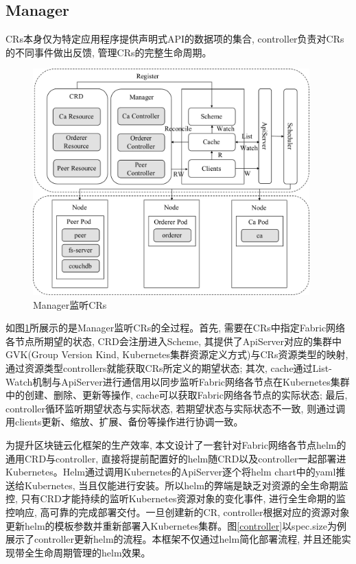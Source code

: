 \subsection{Manager}

CRs本身仅为特定应用程序提供声明式API的数据项的集合, controller负责对CRs的不同事件做出反馈, 管理CRs的完整生命周期。

\begin{figure}[h] %
    \centering %
    \includegraphics[width=0.95\textwidth]{FIGs/chapter4/manager.pdf} %
    \caption{Manager监听CRs} %
    \label{manager} %
\end{figure}%

如图\ref{manager}所展示的是Manager监听CRs的全过程。首先, 需要在CRs中指定Fabric网络各节点所期望的状态, CRD会注册进入Scheme, 其提供了ApiServer对应的集群中GVK(Group Version Kind, Kubernetes集群资源定义方式)与CRs资源类型的映射, 通过资源类型controllers就能获取CRs所定义的期望状态; 其次, cache通过List-Watch机制与ApiServer进行通信用以同步监听Fabric网络各节点在Kubernetes集群中的创建、删除、更新等操作, cache可以获取Fabric网络各节点的实际状态; 最后, controller循环监听期望状态与实际状态, 若期望状态与实际状态不一致, 则通过调用clients更新、缩放、扩展、备份等操作进行协调一致。

为提升区块链云化框架的生产效率, 本文设计了一套针对Fabric网络各节点helm的通用CRD与controller, 直接将提前配置好的helm随CRD以及controller一起部署进Kubernetes。Helm通过调用Kubernetes的ApiServer逐个将helm chart中的yaml推送给Kubernetes, 当且仅能进行安装。所以helm的弊端是缺乏对资源的全生命期监控, 只有CRD才能持续的监听Kubernetes资源对象的变化事件, 进行全生命期的监控响应, 高可靠的完成部署交付。一旦创建新的CR, controller根据对应的资源对象更新helm的模板参数并重新部署入Kubernetes集群。图\ref{controller}以spec.size为例展示了controller更新helm的流程。本框架不仅通过helm简化部署流程, 并且还能实现带全生命周期管理的helm效果。


